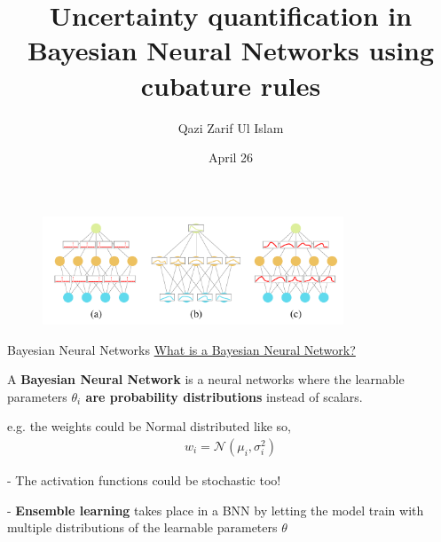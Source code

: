 \documentclass[11pt, aspectratio=169]{beamer}
\title{Uncertainty quantification in Bayesian Neural Networks using cubature rules}
\author{Qazi Zarif Ul Islam}
\date{April 26}
\begin{document}
\maketitle

\begin{frame}
    \begin{figure}
        \centering
        \includegraphics[width=0.8\textwidth]{figs/BNN.png}
    \end{figure}
\end{frame}

\begin{frame}{Bayesian Neural Networks}
    \underline{What is a Bayesian Neural Network?}

    A \textbf<overlay specification>{Bayesian Neural Network} is a neural networks
    where the learnable parameters \textbf{$\theta_i$ are probability distributions}
    instead of scalars.

    e.g. the weights could be Normal distributed like so,
    \begin{align}
        w_i = \mathcal{N}(\mu_i, \sigma_i^2)
    \end{align}

    - The activation functions could be stochastic too!

    - \textbf{Ensemble learning} takes place in a BNN by letting the model 
    train with multiple distributions of the learnable parameters $\theta$



\end{frame}
\end{document}
